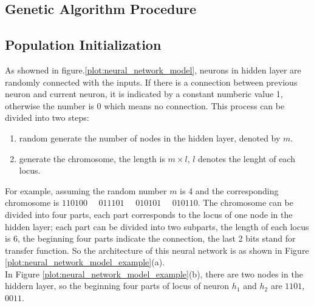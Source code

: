 \documentclass[smallextended]{svjour3}       %
\begin{document}
\begin{multicols}{2}
\section{Genetic Algorithm Procedure}
\subsection{Population Initialization}
As showned in figure.\ref{plot:neural_network_model}, neurons in hidden layer are
randomly connected with the inputs. If there is a connection between previous
neuron and current neuron, it is indicated by a constant numberic value 1, otherwise the
number is 0 which means no connection. This process can be divided into two
steps:
\begin{enumerate}
	\item random generate the number of nodes in the hidden layer, denoted by $m$.
	\item generate the chromosome, the length is $ m \times l$, $l$ denotes the
		lenght of each locus.
\end{enumerate}

For example, assuming the random number $m$ is 4 and the corresponding
chromosome is $110100 \text{ }\text{ }011101\text{ }\text{ } 010101 \text{ }\text{ }010110$. The chromosome can be divided into
four parts, each part corresponds to the locus of one node in the hidden layer;
each part can be divided into two subparts, the length of each locus is 6, the
beginning four parts indicate the connection, the last 2 bits stand for 
transfer function. So the architecture of this neural network is as
shown in Figure \ref{plot:neural_network_model_example}(a).  \\

In Figure \ref{plot:neural_network_model_example}(b), there are two nodes in the
hiddern layer, so the beginning four parts of locus of neuron $h_1$ and $h_2$
are $1 1 0 1 $, $0 0 1 1$. 

\begin{center}
\end{center}
\end{multicols}
\end{document}
